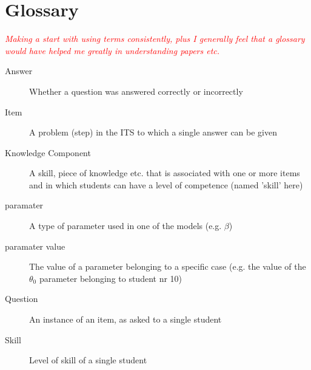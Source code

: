 \documentclass{scrartcl}
\newcommand\todo[1]{\textit{\textcolor{red}{#1}}}
\begin{document}
\section{Glossary}
\todo{
Making a start with using terms consistently, plus I generally feel that a glossary would have helped me greatly in understanding papers etc.}
\begin{description}
\item[Answer]Whether a question was answered correctly or incorrectly
  \item[Item] A problem (step) in the ITS to which a single answer can be given
  \item[Knowledge Component] A skill, piece of knowledge etc. that is associated with one or more items and in which students can have a level of competence (named 'skill' here)
  \item[paramater] A type of parameter used in one of the models (e.g. $\beta$)
  \item[paramater value] The value of a parameter belonging to a specific case (e.g. the value of the $\theta_{0}$ parameter belonging to student nr 10)
  \item[Question] An instance of an item, as asked to a single student
  \item[Skill] Level of skill of a single student
\end{description}
\end{document}
